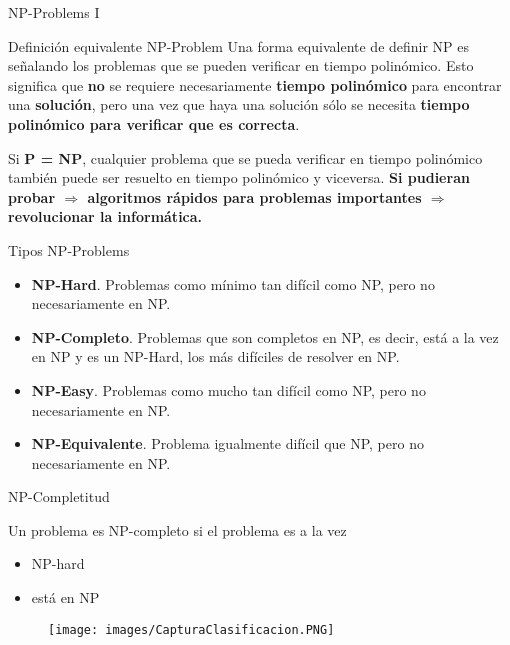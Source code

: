 \documentclass[10pt, mathserif, profesionalfont]{beamer}
\begin{document}
	
	\begin{frame}{NP-Problems I}
		\begin{block}{Definición equivalente NP-Problem}
			Una forma equivalente de definir NP es señalando los problemas que se pueden verificar en tiempo polinómico. 
			Esto significa que \textbf{no} se requiere necesariamente \textbf{tiempo polinómico} para encontrar una \textbf{solución}, 
			pero una vez que haya una solución sólo se necesita {\textbf{tiempo polinómico para verificar que es correcta}}. 
		\end{block}
		
		\begin{block}{}
			Si {\textbf{P = NP}}, cualquier problema que se pueda verificar en tiempo polinómico también puede ser resuelto en tiempo polinómico y viceversa.
			{\textbf{Si pudieran probar $\Rightarrow$ algoritmos rápidos para problemas importantes $\Rightarrow$ revolucionar la informática.}}
		\end{block}
	\end{frame}
	
	
	\begin{frame}{Tipos NP-Problems}
		
		\begin{itemize}
			\item {\textbf{NP-Hard}}. Problemas como mínimo tan difícil como NP, pero no necesariamente en NP.
			\item {\textbf{NP-Completo}}. Problemas que son completos en NP, es decir, está a la vez en NP y es un NP-Hard, los más difíciles de resolver en NP.
			\item {\textbf{NP-Easy}}. Problemas como mucho tan difícil como NP, pero no necesariamente en NP.
			\item {\textbf{NP-Equivalente}}. Problema igualmente difícil que NP, pero no necesariamente en NP.
		\end{itemize}
		
	\end{frame}
	
	
	\begin{frame}{NP-Completitud}
		
		\begin{block}{}
			Un problema es NP-completo si el problema es a la vez
			\begin{itemize}
				\item NP-hard
				\item está en NP
			\end{itemize}
		\end{block}
		
		\begin{figure}[h!] 
			\begin{center} 
				\texttt{[image: images/CapturaClasificacion.PNG]} 
			\end{center} 
		\end{figure}
		
	\end{frame}
	
\end{document}
